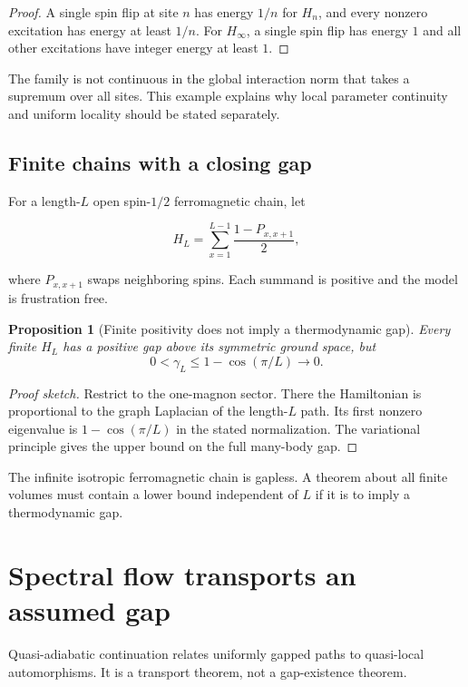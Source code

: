 \documentclass[12pt]{article}
\newtheorem{proposition}[theorem]{Proposition}
\theoremstyle{definition}
\theoremstyle{remark}
\begin{document}
\begin{proof}
A single spin flip at site $n$ has energy $1/n$ for $H_n$, and every nonzero
excitation has energy at least $1/n$. For $H_\infty$, a single spin flip has
energy $1$ and all other excitations have integer energy at least $1$.
\end{proof}

The family is not continuous in the global interaction norm that takes a
supremum over all sites. This example explains why local parameter continuity
and uniform locality should be stated separately.

\subsection{Finite chains with a closing gap}

For a length-$L$ open spin-$1/2$ ferromagnetic chain, let

\[
H_L
=
\sum_{x=1}^{L-1}\frac{1-P_{x,x+1}}{2},
\]

where $P_{x,x+1}$ swaps neighboring spins. Each summand is positive and the
model is frustration free.

\begin{proposition}[Finite positivity does not imply a thermodynamic gap]
Every finite $H_L$ has a positive gap above its symmetric ground space, but
\[
0<\gamma_L
\leq
1-\cos(\pi/L)
\longrightarrow0.
\]
\end{proposition}

\begin{proof}[Proof sketch]
Restrict to the one-magnon sector. There the Hamiltonian is proportional to
the graph Laplacian of the length-$L$ path. Its first nonzero eigenvalue is
$1-\cos(\pi/L)$ in the stated normalization. The variational principle gives
the upper bound on the full many-body gap.
\end{proof}

The infinite isotropic ferromagnetic chain is gapless. A theorem about all
finite volumes must contain a lower bound independent of $L$ if it is to imply
a thermodynamic gap.

\section{Spectral flow transports an assumed gap}

Quasi-adiabatic continuation relates uniformly gapped paths to quasi-local
automorphisms. It is a transport theorem, not a gap-existence theorem.
\end{document}
